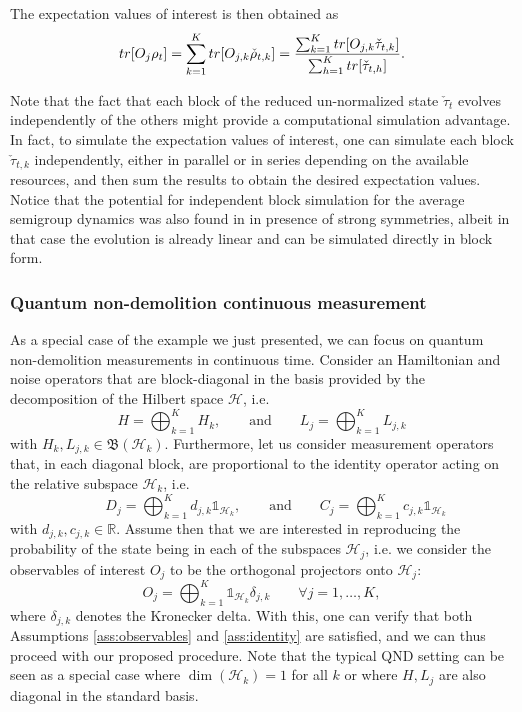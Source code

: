 \documentclass[aihp,12pt]{imsart}
\newcommand{\Hc}{\mathcal{H}}
\newcommand{\Rb}{\mathbb{R}}
\newcommand{\Bf}{\mathfrak{B}}
\newcommand{\one}{\mathbb{1}}
\newcommand{\tr}{{\rm tr}}
\theoremstyle{theorem}
\theoremstyle{definition}
\theoremstyle{remark}
\begin{document}
The expectation values of interest is then obtained as
\[\tr[O_j \rho_t] = \sum_{k=1}^K\tr[O_{j,k}\check{\rho}_{t,k}] =  \frac{\sum_{k=1}^K\tr[O_{j,k}\check{\tau}_{t,k}]}{\sum_{h=1}^K\tr[\check{\tau}_{t,h}]}. \]

Note that the fact that each block of the reduced un-normalized state $\check{\tau}_t$ evolves independently of the others might provide a computational simulation advantage. In fact, to simulate the expectation values of interest,  one can simulate each block $\check{\tau}_{t,k}$ independently, either in parallel or in series depending on the available resources, and then sum the results to obtain the desired expectation values. Notice that the potential for independent block simulation for the average semigroup dynamics was also found in \cite{prxq2024} in presence of strong symmetries, albeit in that case the evolution is already linear and can be simulated directly in block form. 

\subsubsection{Quantum non-demolition continuous measurement}
As a special case of the example we just presented, we can focus on quantum non-demolition measurements in continuous time.
Consider an Hamiltonian and noise operators that are block-diagonal in the basis provided by the decomposition of the Hilbert space $\Hc$, i.e. 
\[H= \bigoplus_{k=1}^K H_k, \qquad\text{and}\qquad L_j= \bigoplus_{k=1}^K L_{j,k}\]
with $H_k,L_{j,k}\in\Bf(\Hc_k)$.
Furthermore, let us consider measurement operators that, in each diagonal block, are proportional to the identity operator acting on the relative subspace 
$\Hc_k$, i.e. 
\[\qquad D_j = \bigoplus_{k=1}^K d_{j,k}\one_{\Hc_{k}}, \qquad\text{and}\qquad C_j = \bigoplus_{k=1}^K c_{j,k} \one_{\Hc_k} \]
with $d_{j,k},c_{j,k}\in\Rb$.
Assume then that we are interested in reproducing the probability of the state being in each of the subspaces $\Hc_j$, i.e. we consider the observables of interest $O_j$ to be the orthogonal projectors onto $\Hc_j$:
\[O_j = \bigoplus_{k=1}^K \one_{\Hc_k}\delta_{j,k}\qquad \forall j=1,\dots,K,\]
where $\delta_{j,k}$ denotes the Kronecker delta.
With this, one can verify that both Assumptions \ref{ass:observables} and \ref{ass:identity} are satisfied, and we can thus proceed with our proposed procedure. 
Note that the typical QND setting \cite{Benoist_2014,LIANG2024111590} can be seen as a special case where $\dim(\Hc_k)=1$ for all $k$ or where $H, L_j$ are also diagonal in the standard basis.
\end{document}
